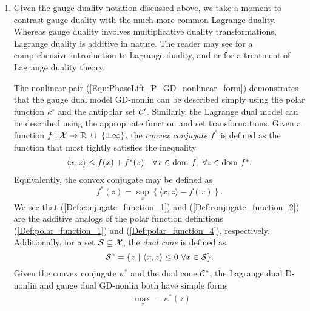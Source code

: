 \begin{enumerate}
\item

Given the gauge duality notation discussed above, we take a moment to contrast gauge duality with the much more common Lagrange duality.  Whereas gauge duality involves multiplicative duality transformations, Lagrange duality is additive in nature.  The reader may see \cite[Chapter 5]{boyd2004convex} for a comprehensive introduction to Lagrange duality, and \cite[Section 28]{rockafellar1970convex} or \cite[Chapter 2]{ben2001lectures} for a treatment of Lagrange duality theory.

The nonlinear pair (\ref{Eqn:PhaseLift_P_GD_nonlinear_form}) demonstrates that the gauge dual model GD-nonlin can be described simply using the polar function $\kappa^\circ$ and the antipolar set ${\mathcal C}'$.  Similarly, the Lagrange dual model can be described using the appropriate function and set transformations.  Given a function $f : {\mathcal X} \rightarrow {\mathbb R} \ \cup \ \{\pm \infty\}$, the \textit{convex conjugate} $f^*$ is defined as the function that most tightly satisfies the inequality
\begin{equation} 			\label{Def:conjugate_function_1}
\begin{array}{ll}
	\langle x, z \rangle \leq f(x) + f^*(z)
			&	\forall x \in \textnormal{dom} \ f, \ \forall z \in \textnormal{dom} \ f^*.
\end{array}
\end{equation}
Equivalently, the convex conjugate may be defined as \cite[Section 12]{rockafellar1970convex}
\begin{equation} 			\label{Def:conjugate_function_2}
f^*(z) = \sup_x \left\{ \langle x, z \rangle - f(x)  \right\}.
\end{equation}
We see that (\ref{Def:conjugate_function_1}) and (\ref{Def:conjugate_function_2}) are the additive analogs of the polar function definitions (\ref{Def:polar_function_1}) and (\ref{Def:polar_function_4}), respectively.  Additionally, for a set ${\mathcal S} \subseteq {\mathcal X}$, the \textit{dual cone} is defined as
\begin{equation}			\label{Def:dual_cone}
{\mathcal S}^* = \{ z \ | \ \langle x, z \rangle \leq 0 \ \forall x \in {\mathcal S} \}.
\end{equation}
Given the convex conjugate $\kappa^*$ and the dual cone ${\mathcal C}^*$, the Lagrange dual D-nonlin and gauge dual GD-nonlin both have simple forms
\begin{equation} 			
\begin{array}{lllllll}
	&	\max\limits_{\substack{z}}
		&	-\kappa^*(z)

\end{array}
\end{equation}
\end{enumerate}
